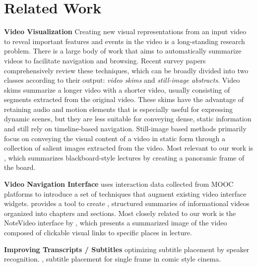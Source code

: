 \section{Related Work}

\textbf{Video Visualization} Creating new visual representations from an input video to reveal important features and events in the video is a long-standing research problem. There is a large body of work that aims to automatically summarize videos to facilitate navigation and browsing. Recent survey papers \cite{truong2007video,borgo2011survey} comprehensively review these techniques, which can be broadly divided into two classes according to their output: \textit{video skims} and \textit{still-image abstracts}. Video skims \cite{he1999auto,ekin2003automatic,ngo2005video,lu2013story} summarize a longer video with a shorter video, usually consisting of segments extracted from the original video. These skims have the advantage of retaining audio and motion elements that is especially useful for expressing dynamic scenes, but they are less suitable for conveying dense, static information and still rely on timeline-based navigation. Still-image based methods \cite{uchihashi1999video,barnes2010video,hwang2006cinema,boreczky2000interactive}
primarily focus on conveying the visual content of a
video in static form through a collection of salient images extracted from the video. Most relevant to our work is \cite{choudary2007summarization}, which summarizes blackboard-style lectures by creating a panoramic frame of the board.

\textbf{Video Navigation Interface}
\cite{kim2014data} uses interaction data collected from MOOC platforms to introduce a set of techniques that augment existing video interface widgets. \cite{pavel2014video} provides a tool to create , structured summaries of informational videos organized into chapters and sections. 
Most closely related to our work is the NoteVideo interface by \cite{monserrat2013notevideo}, which presents a summarized image of the video composed of clickable visual links to specific places in  lecture.

\textbf{Improving Transcripts / Subtitles}
\cite{hu2015speaker} optimizing subtitle placement by speaker recognition. \cite{kurlander1996comic}, \cite{chun2006automated} subtitle placement for single frame in comic style cinema.



